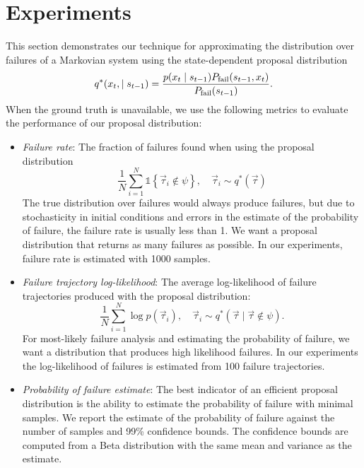 \section{Experiments}
\label{sec:ch5_expr}
This section demonstrates our technique for approximating the distribution over failures of a Markovian system using the state-dependent proposal distribution
\begin{equation}
    q^*(x_t, \mid s_{t-1}) = \frac{p(x_t \mid s_{t-1}) P_{\rm fail}(s_{t-1}, x_t)}{P_{\rm fail}(s_{t-1})} \text{.} \label{eq:markov_disturbance_policy}
\end{equation}
When the ground truth is unavailable, we use the following metrics to evaluate the performance of our proposal distribution:
\begin{itemize}
    \item \emph{Failure rate}: The fraction of failures found when using the proposal distribution
    \begin{equation}
        \frac{1}{N} \sum_{i=1}^N \mathds{1}\left\{ \vec{\tau}_i \not \in \psi \right\}, \quad \vec{\tau}_i \sim q^*(\vec{\tau})
    \end{equation}
    The true distribution over failures would always produce failures, but due to stochasticity in initial conditions and errors in the estimate of the probability of failure, the failure rate is usually less than \num{1}. We want a proposal distribution that returns as many failures as possible. In our experiments, failure rate is estimated with \num{1000} samples. 
    \item \emph{Failure trajectory log-likelihood}: The average log-likelihood of failure trajectories produced with the proposal distribution: 
    \begin{equation}
        \frac{1}{N} \sum_{i=1}^N \log p(\vec{\tau}_i), \quad \vec{\tau}_i \sim q^*(\vec{\tau} \mid \vec{\tau} \not \in \psi) \text{.}
    \end{equation}
    For most-likely failure analysis and estimating the probability of failure, we want a distribution that produces high likelihood failures. In our experiments the log-likelihood of failures is estimated from \num{100} failure trajectories.
    \item \emph{Probability of failure estimate}: The best indicator of an efficient proposal distribution is the ability to estimate the probability of failure with minimal samples. We report the estimate of the probability of failure against the number of samples and \num{99}\% confidence bounds. The confidence bounds are computed from a Beta distribution with the same mean and variance as the estimate.
\end{itemize}

